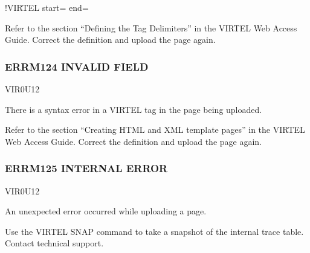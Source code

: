 \documentclass[letterpaper,10pt,english]{sphinxmanual}
\begin{document}
\begin{sphinxVerbatim}[commandchars=\\\{\}]
\PYGZlt{}!\PYGZhy{}\PYGZhy{}VIRTEL start=\PYGZdq{}\PYGZob{}\PYGZob{}\PYGZob{}\PYGZdq{} end=\PYGZdq{}\PYGZcb{}\PYGZcb{}\PYGZcb{}\PYGZdq{} \PYGZhy{}\PYGZhy{}\PYGZgt{}
\end{sphinxVerbatim}
\begin{description}
\sphinxAtStartPar
Refer to the section “Defining the Tag Delimiters” in the VIRTEL Web Access Guide. Correct the definition and upload the page again.

\end{description}


\subsubsection{ERRM124 \sphinxhyphen{} INVALID FIELD}
\label{\detokenize{messages:errm124-invalid-field}}\begin{description}
\sphinxAtStartPar
VIR0U12

\sphinxAtStartPar
There is a syntax error in a VIRTEL tag in the page being uploaded.

\sphinxAtStartPar
Refer to the section “Creating HTML and XML template pages” in the VIRTEL Web Access Guide. Correct the definition and upload the page again.

\end{description}


\subsubsection{ERRM125 \sphinxhyphen{} INTERNAL ERROR}
\label{\detokenize{messages:errm125-internal-error}}\begin{description}
\sphinxAtStartPar
VIR0U12

\sphinxAtStartPar
An unexpected error occurred while uploading a page.

\sphinxAtStartPar
Use the VIRTEL SNAP command to take a snapshot of the internal trace table. Contact technical support.

\end{description}
\end{document}
